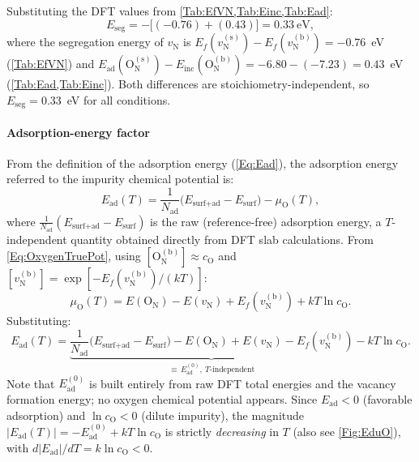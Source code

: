 \documentclass[preprint,12pt,sort&compress]{elsarticle}
\newcommand{\?}{\stackrel{?}{=}}
\begin{document}

Substituting the DFT values from \cref{Tab:EfVN,Tab:Einc,Tab:Ead}:
\begin{equation}
E_\text{seg} = -\bigl[(-0.76) + (0.43)\bigr] = 0.33~\text{eV},
\label{Eq:App:EsegValue}
\end{equation}
where the segregation energy of $v_\text{N}$ is $E_f(v_\text{N}^{(\text{s})}) - E_f(v_\text{N}^{(\text{b})}) = -0.76$~eV (\cref{Tab:EfVN}) and $E_\text{ad}(\text{O}_\text{N}^{(\text{s})}) - E_\text{inc}(\text{O}_\text{N}^{(\text{b})}) = -6.80 - (-7.23) = 0.43$~eV (\cref{Tab:Ead,Tab:Einc}). Both differences are stoichiometry-independent, so $E_\text{seg} = 0.33$~eV for all conditions.

\paragraph{Adsorption-energy factor} From the definition of the adsorption energy (\cref{Eq:Ead}), the adsorption energy referred to the impurity chemical potential is:
\begin{equation}
E_\text{ad}(T) = \frac{1}{N_\text{ad}}\bigl(E_\text{surf+ad} - E_\text{surf}\bigr) - \mu_\text{O}(T),
\end{equation}
where $\frac{1}{N_\text{ad}}(E_\text{surf+ad} - E_\text{surf})$ is the raw (reference-free) adsorption energy, a $T$-independent quantity obtained directly from DFT slab calculations. From \cref{Eq:OxygenTruePot}, using $[\text{O}_\text{N}^{(\text{b})}] \approx c_\text{O}$ and $[v_\text{N}^{(\text{b})}] = \exp[-E_f(v_\text{N}^{(\text{b})})/(kT)]$:
\begin{equation}
\mu_\text{O}(T) = E(\text{O}_\text{N}) - E(v_\text{N}) + E_f(v_\text{N}^{(\text{b})}) + kT\ln c_\text{O}.
\label{Eq:App:muOimp}
\end{equation}
Substituting:
\begin{equation}
E_\text{ad}(T) = \underbrace{\frac{1}{N_\text{ad}}\bigl(E_\text{surf+ad} - E_\text{surf}\bigr) - E(\text{O}_\text{N}) + E(v_\text{N}) - E_f(v_\text{N}^{(\text{b})})}_{\displaystyle\equiv\,E_\text{ad}^{(0)},\ T\text{-independent}} - kT \ln c_\text{O}.
\label{Eq:App:EadImpExplicit}
\end{equation}
Note that $E_\text{ad}^{(0)}$ is built entirely from raw DFT total energies and the vacancy formation energy; no oxygen chemical potential appears. Since $E_\text{ad} < 0$ (favorable adsorption) and $\ln c_\text{O} < 0$ (dilute impurity), the magnitude $|E_\text{ad}(T)| = -E_\text{ad}^{(0)} + kT\ln c_\text{O}$ is strictly \emph{decreasing} in $T$ (also see \cref{Fig:EduO}), with $d|E_\text{ad}|/dT = k\ln c_\text{O} < 0$.
\end{document}
